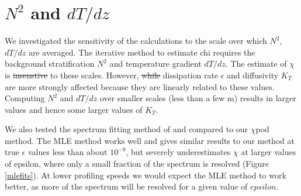 \documentclass{ametsoc}
\providecommand{\DIFadd}[1]{{\protect\color{blue}\uwave{#1}}} %
\providecommand{\DIFdel}[1]{{\protect\color{red}\sout{#1}}}                      %
\providecommand{\DIFaddbegin}{} %
\providecommand{\DIFaddend}{} %
\providecommand{\DIFdelbegin}{} %
\providecommand{\DIFdelend}{} %
\begin{document}


\section{$N^2$ and $dT/dz$}

We investigated the sensitivity of the calculations to the scale over which $N^2$, $dT/dz$ are averaged. The iterative method to estimate chi requires the background stratification $N^2$ and temperature gradient $dT/dz$. The estimate of $\chi$ is \DIFdelbegin \DIFdel{insenstive }\DIFdelend \DIFaddbegin \DIFadd{insensitive }\DIFaddend to these scales. However, \DIFdelbegin \DIFdel{while }\DIFdelend dissipation rate $\epsilon$ and diffusivity $K_T$ are more strongly affected because they are linearly related to these values. Computing $N^2$ and $dT/dz$ over smaller scales (less than a few m) results in larger values and hence some larger values of $K_T$.


\DIFdelbegin %

\DIFdelend \appendix[B]


We also tested the spectrum fitting method of \cite{ruddicketal00} and compared to our $\chi$pod method. The MLE method works well and gives similar results to our method at true $\epsilon$ values less than about $10^{-9}$, but severely underestimates $\chi$ at larger values of epsilon, where only a small fraction of the spectrum is resolved (Figure \ref{mlefits}). At lower profiling speeds we would expect the MLE method to work better, as more of the spectrum will be resolved for a given value of \DIFdelbegin \DIFdel{$epsilon$}\DIFdelend \DIFaddbegin \DIFadd{$\epsilon$}\DIFaddend .
\end{document}
